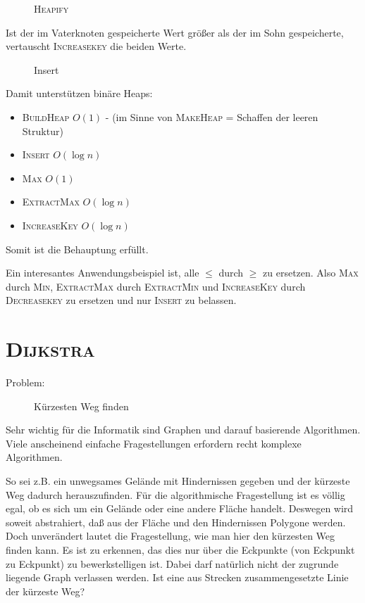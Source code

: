 \documentclass[ngerman,draft,parskip=half*,twoside]{scrreprt}
\theoremstyle{break}
\begin{document}
\begin{figure}[H]
  \centering
  \caption{\textsc{Heapify}}
  \label{121103a}
\end{figure}
Ist der im Vaterknoten gespeicherte Wert größer als der im Sohn gespeicherte, vertauscht  \textsc{Increasekey} die beiden Werte.

\begin{figure}[H]
  \centering
  \caption{Insert}
  \label{121103b}
\end{figure}

Damit unterstützen binäre Heaps:
\begin{itemize}
\item \textsc{BuildHeap} $O(1)$ - (im Sinne von \textsc{MakeHeap} = Schaffen der leeren Struktur)
\item \textsc{Insert} $O(\log n)$
\item \textsc{Max} $O(1)$
\item \textsc{ExtractMax} $O(\log n)$
\item \textsc{IncreaseKey} $O(\log n)$
\end{itemize}
Somit ist die Behauptung erfüllt.

Ein interesantes Anwendungsbeispiel ist, alle $\leq$ durch $\geq$ zu ersetzen. Also \textsc{Max} durch \textsc{Min},
\textsc{ExtractMax} durch \textsc{ExtractMin} und \textsc{IncreaseKey} durch \textsc{Decreasekey} zu ersetzen und nur \textsc{Insert}
zu belassen.

\section{\textsc{Dijkstra}}

 Problem:
\begin{figure}[H]
  \centering
  \caption{Kürzesten Weg finden}
  \label{121103c}
\end{figure}

Sehr wichtig für die Informatik sind Graphen und darauf basierende Algorithmen. Viele anscheinend einfache Fragestellungen erfordern
recht komplexe Algorithmen.

So sei z.B. ein unwegsames Gelände mit Hindernissen gegeben und der kürzeste Weg dadurch herauszufinden. Für die algorithmische
Fragestellung ist es völlig egal, ob es sich um ein Gelände oder eine andere Fläche handelt. Deswegen wird soweit abstrahiert, daß
aus der Fläche und den Hindernissen Polygone werden. Doch unverändert lautet die Fragestellung, wie man hier den kürzesten Weg
finden kann. Es ist zu erkennen, das dies nur über die Eckpunkte (von Eckpunkt zu Eckpunkt)
zu bewerkstelligen ist. Dabei darf natürlich nicht der zugrunde liegende Graph verlassen werden. Ist eine aus Strecken zusammengesetzte
Linie der kürzeste Weg?
\end{document}
